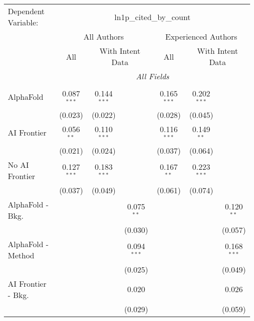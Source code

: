 \begingroup
\centering
\begin{tabular}{lcccccc}
   \tabularnewline \midrule \midrule
   Dependent Variable: & \multicolumn{6}{c}{ln1p\_cited\_by\_count}\\
 & \multicolumn{3}{c}{All Authors} & \multicolumn{3}{c}{Experienced Authors} \\
\cmidrule(lr){2-4} \cmidrule(lr){5-7}
 & \multicolumn{1}{c}{All} & \multicolumn{2}{c}{With Intent Data} & \multicolumn{1}{c}{All} & \multicolumn{2}{c}{With Intent Data} \\
\cmidrule(lr){2-2} \cmidrule(lr){3-4} \cmidrule(lr){5-5} \cmidrule(lr){6-7}
 & \multicolumn{6}{c}{\textit{All Fields}} \\ \\
   AlphaFold               & 0.087$^{***}$ & 0.144$^{***}$ &               & 0.165$^{***}$ & 0.202$^{***}$ &   \\   
                           & (0.023)       & (0.022)       &               & (0.028)       & (0.045)       &   \\   
   AI Frontier             & 0.056$^{**}$  & 0.110$^{***}$ &               & 0.116$^{***}$ & 0.149$^{**}$  &   \\   
                           & (0.021)       & (0.024)       &               & (0.037)       & (0.064)       &   \\   
   No AI Frontier          & 0.127$^{***}$ & 0.183$^{***}$ &               & 0.167$^{**}$  & 0.223$^{***}$ &   \\   
                           & (0.037)       & (0.049)       &               & (0.061)       & (0.074)       &   \\   
   AlphaFold - Bkg.        &               &               & 0.075$^{**}$  &               &               & 0.120$^{**}$\\   
                           &               &               & (0.030)       &               &               & (0.057)\\   
   AlphaFold - Method      &               &               & 0.094$^{***}$ &               &               & 0.168$^{***}$\\   
                           &               &               & (0.025)       &               &               & (0.049)\\   
   AI Frontier - Bkg.      &               &               & 0.020         &               &               & 0.026\\   
                           &               &               & (0.029)       &               &               & (0.059)\\   

\end{tabular}
